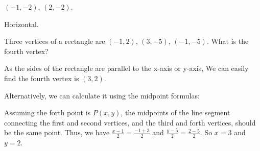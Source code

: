 \begin{questions}
\begin{tasks}
    \task $(-1, -2)$, $(2, -2)$.

    \begin{solution}
      Horizontal.
    \end{solution}

  \end{tasks}

  \item Three vertices of a rectangle are $(-1, 2)$, $(3, -5)$, $(-1, -5)$. What is the fourth vertex?

  \begin{solution}
    \begin{note}
    \end{note}

    As the sides of the rectangle are parallel to the x-axis or y-axis, We can easily find the fourth vertex is $(3, 2)$.

    Alternatively, we can calculate it using the midpoint formulas:

    Assuming the forth point is $P(x,y)$, the midpoints of the line segment connecting the first and second vertices, and the third and forth vertices, should be the same point. Thus, we have \(\frac{x-1}{2} = \frac{-1+3}{2} \) and \(\frac{y-5}{2} = \frac{2-5}{2}\). So $x=3$ and $y=2$.

  \end{solution}

\end{questions}